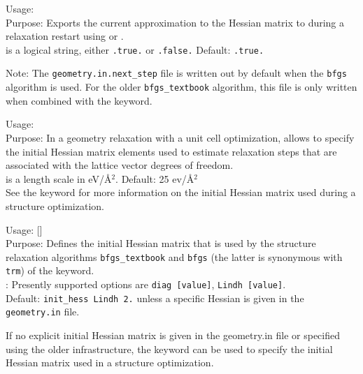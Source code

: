 {
  \noindent
  Usage:   \\
  Purpose: Exports the current approximation to
  the Hessian matrix to  during a 
  relaxation restart using  or
  . \\ 
   is a logical string, either \texttt{.true.} or
    \texttt{.false.} Default: \texttt{.true.} \\
}

Note: The \texttt{geometry.in.next\_step} file is written out by
default when the  \texttt{bfgs} algorithm
is used. For the older \texttt{bfgs\_textbook} algorithm, this file is
only written when combined with the 
keyword. 

{
  \noindent
  Usage:   \\[1.0ex]
  Purpose: In a geometry relaxation with a unit cell optimization,
    allows to specify the initial Hessian matrix elements used to
    estimate relaxation steps that are associated with the lattice
    vector degrees of freedom.
  \\[1.0ex]
   is a length scale in eV/{\AA$^2$}. Default: 25
  ev/{\AA$^2$} \\ 
}
See the  keyword for more information on the
initial Hessian matrix used during a structure optimization.

{
  \noindent
  Usage:   []
  \\[1.0ex]
  Purpose: Defines the initial Hessian matrix that is used by the
  structure relaxation algorithms \texttt{bfgs\_textbook} and
  \texttt{bfgs} (the latter is synonymous with \texttt{trm}) of the
   keyword.
  \\[1.0ex]
  : Presently supported options are \texttt{diag [value]}, \texttt{Lindh 
  [value]}.
  \\[1.0ex]
  Default: \texttt{init\_hess Lindh 2.} unless a specific Hessian is
  given in the \texttt{geometry.in} file. \\ 
}

If no explicit initial Hessian matrix is given in the geometry.in file
or specified using the older 
infrastructure, the keyword  can be used to
specify the initial Hessian matrix used in a structure optimization. 

